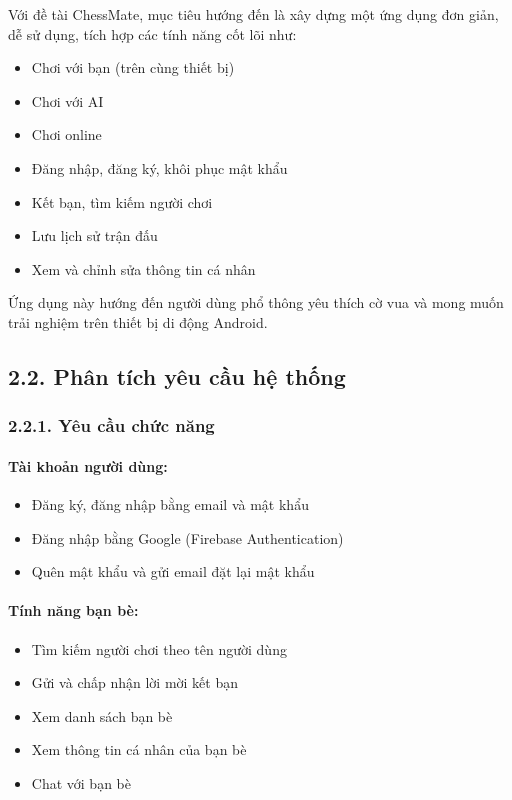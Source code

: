 \documentclass[a4paper,12pt]{article}
\begin{document}
\noindent Với đề tài ChessMate, mục tiêu hướng đến là xây dựng một ứng dụng đơn giản, dễ sử dụng, tích hợp các tính năng cốt lõi như:
\begin{itemize}[label=$\cdot$]
    \item Chơi với bạn (trên cùng thiết bị)
    \item Chơi với AI
    \item Chơi online
    \item Đăng nhập, đăng ký, khôi phục mật khẩu
    \item Kết bạn, tìm kiếm người chơi
    \item Lưu lịch sử trận đấu
    \item Xem và chỉnh sửa thông tin cá nhân

\end{itemize}
\noindent Ứng dụng này hướng đến người dùng phổ thông yêu thích cờ vua và mong muốn trải nghiệm trên thiết bị di động Android.

\subsection*{2.2. Phân tích yêu cầu hệ thống} %
\subsubsection*{2.2.1. Yêu cầu chức năng} %

\paragraph{Tài khoản người dùng:} %
\begin{itemize}[label=·]
    \item Đăng ký, đăng nhập bằng email và mật khẩu
    \item Đăng nhập bằng Google (Firebase Authentication)
    \item Quên mật khẩu và gửi email đặt lại mật khẩu
\end{itemize}

\paragraph{Tính năng bạn bè:} %
\begin{itemize}[label=·]
    \item Tìm kiếm người chơi theo tên người dùng
    \item Gửi và chấp nhận lời mời kết bạn
    \item Xem danh sách bạn bè
    \item Xem thông tin cá nhân của bạn bè
    \item Chat với bạn bè
\end{itemize}
\end{document}
